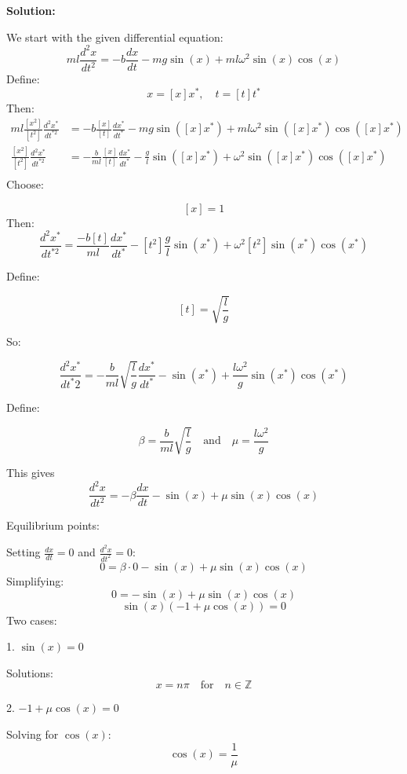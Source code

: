 \documentclass[12pt]{article}
\newenvironment{solution}{
    \textbf{Solution:}
    
}{
    
    \vspace{2em}
}
\begin{document}
\begin{solution}
    We start with the given differential equation:
    \[
    ml\frac{d^2x}{dt^2} = -b\frac{dx}{dt} - mg\sin(x) + ml \omega^2 \sin(x) \cos(x)
    \]
    Define:
    \[
    x = [x]x^*, \quad t = [t]t^*
    \]
    Then:
    \[
      \begin{aligned}
      ml \frac{[x^2]}{[t^2]}\frac{d^2x^*}{dt^{*2}} &= -b \frac{[x]}{[t]}\frac{dx^*}{dt^*} - mg \sin([x]x^*) + ml \omega^2 \sin([x]x^*) \cos([x]x^*) \\
      \frac{[x^2]}{[t^2]}\frac{d^2x^*}{dt^{*2}} &= -\frac{b}{ml} \frac{[x]}{[t]}\frac{dx^*}{dt^*} - \frac{g}{l} \sin([x]x^*) + \omega^2 \sin([x]x^*) \cos([x]x^*) \\
      \end{aligned}
    \]
    Choose:
    
    \[
    [x] = 1
    \]
    Then:
    \[
    \frac{d^2x^*}{dt^{*2}} = \frac{-b[t]}{ml}\frac{dx^*}{dt^*} - [t^2]\frac{g}{l}\sin(x^*) + \omega^2 [t^2] \sin(x^*) \cos(x^*)
    \]
    
    Define:
    
    \[
    [t] = \sqrt{\frac{l}{g}}
    \]
    
    So:
    
    \[
    \frac{d^2x^*}{dt^*2} = -\frac{b}{ml} \sqrt{\frac{l}{g}}\frac{dx^*}{dt^*} -\sin(x^*) + \frac{l\omega^2}{g} \sin(x^*) \cos(x^*)
    \]
    
    Define:
    
    \[
    \beta = \frac{b}{ml} \sqrt{\frac{l}{g}} \quad \text{and} \quad \mu = \frac{l\omega^2}{g}
    \]
    
    This gives
    \[
    \frac{d^2x}{dt^2} = -\beta \frac{dx}{dt} - \sin(x) + \mu \sin(x) \cos(x)
    \]
    
    
    
    Equilibrium points:
    
    Setting \(\frac{dx}{dt} = 0\) and \(\frac{d^2x}{dt^2} = 0\):
    \[
    0 = \beta \cdot 0 - \sin(x) + \mu \sin(x) \cos(x)
    \]
    Simplifying:
    \[
    0 = -\sin(x) + \mu \sin(x) \cos(x)
    \]
    \[
    \sin(x) (-1 + \mu \cos(x)) = 0
    \]
    Two cases:
    
    1. \(\sin(x) = 0\)
       
       Solutions:
       \[
       x = n\pi \quad \text{for} \quad n \in \mathbb{Z}
       \]
       
    2. \(-1 + \mu \cos(x) = 0\)
       
       Solving for \(\cos(x)\):
       \[
       \cos(x) = \frac{1}{\mu}
       \]
       

\end{solution}
\end{document}

